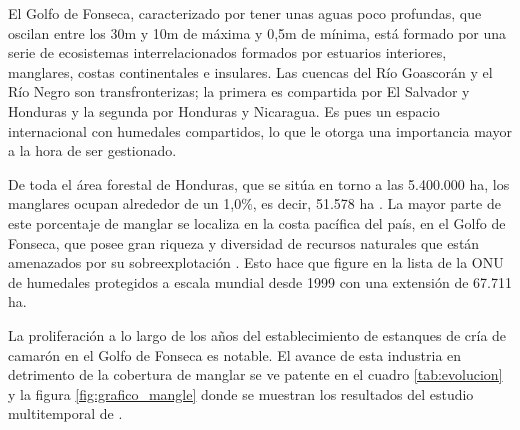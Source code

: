 El Golfo de Fonseca, caracterizado por tener unas aguas poco profundas, que oscilan entre los 30m y 10m de máxima y 0,5m de mínima, está formado por una serie de ecosistemas interrelacionados formados por estuarios interiores, manglares, costas continentales e insulares. Las cuencas del Río Goascorán y el Río Negro son transfronterizas; la primera es compartida por El Salvador y Honduras y la segunda por Honduras y Nicaragua. Es pues un espacio internacional con humedales compartidos, lo que le otorga una importancia mayor a la hora de ser gestionado.%

De toda el área forestal de Honduras, que se sitúa en torno a las 5.400.000 ha, los manglares ocupan alrededor de un 1,0\%, es decir, 51.578 ha \citep{anuario2013}. La mayor parte de este porcentaje de manglar se localiza en la costa pacífica del país, en el Golfo de Fonseca, que posee gran riqueza y diversidad de recursos naturales que están amenazados por su sobreexplotación \citep{Jimenez1994}. Esto hace que figure en la lista \cite{Ramsar2014} de la ONU de humedales protegidos a escala mundial desde 1999 con una extensión de 67.711 ha.%

La proliferación a lo largo de los años del establecimiento de estanques de cría de camarón en el Golfo de Fonseca es notable. El avance de esta industria en detrimento de la cobertura de manglar se ve patente en el cuadro \ref{tab:evolucion} y la figura \ref{fig:grafico_mangle} donde se muestran los resultados del estudio multitemporal de \cite{laborate2014}.%

